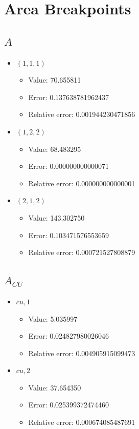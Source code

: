 \documentclass{article}%
\begin{document}
\section{Area Breakpoints}%
\thispagestyle{plain}%
\subsection{$A$}%
\begin{itemize}%
	\item $(1, 1, 1)$%
	\begin{itemize}%
		\item Value: 70.655811%
		\item Error: 0.137638781962437%
		\item Relative error: 0.001944230471856%
	\end{itemize}%
	\item $(1, 2, 2)$%
	\begin{itemize}%
		\item Value: 68.483295%
		\item Error: 0.000000000000071%
		\item Relative error: 0.000000000000001%
	\end{itemize}%
	\item $(2, 1, 2)$%
	\begin{itemize}%
		\item Value: 143.302750%
		\item Error: 0.103471576553659%
		\item Relative error: 0.000721527808879%
	\end{itemize}%
\end{itemize}%
\subsection{$A_{CU}$}%
\begin{itemize}%
	\item $\textit{cu},1$%
	\begin{itemize}%
		\item Value: 5.035997%
		\item Error: 0.024827980026046%
		\item Relative error: 0.004905915099473%
	\end{itemize}%
	\item $\textit{cu},2$%
	\begin{itemize}%
		\item Value: 37.654350%
		\item Error: 0.025399372474460%
		\item Relative error: 0.000674085487691%
	\end{itemize}%
\end{itemize}%
\end{document}
